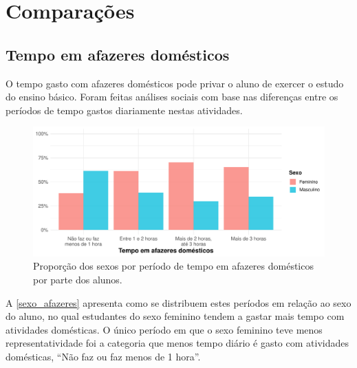 

\chapter{Comparações}
\section{Tempo em afazeres domésticos}
O tempo gasto com afazeres domésticos pode privar o aluno de exercer o estudo
do ensino básico. Foram feitas análises sociais com base nas diferenças entre os 
períodos de tempo gastos diariamente nestas atividades.

\begin{figure}[h]
    \label{sexo_afazeres}
    \caption{Proporção dos sexos por período de tempo em afazeres domésticos por parte
    dos alunos.\label{sexo_afazeres}} %
    \begin{center}
        \includegraphics[width=16cm]{img/sexo_afazeres.pdf}
    \end{center}
\end{figure}

A \autoref{sexo_afazeres} apresenta como se distribuem estes períodos em relação ao sexo
do aluno, no qual estudantes do sexo feminino tendem a gastar mais tempo com atividades
domésticas. O único período em que o sexo feminino teve
menos representatividade foi a  categoria que menos tempo diário é gasto com atividades domésticas,
“Não faz ou faz menos de 1 hora”.

